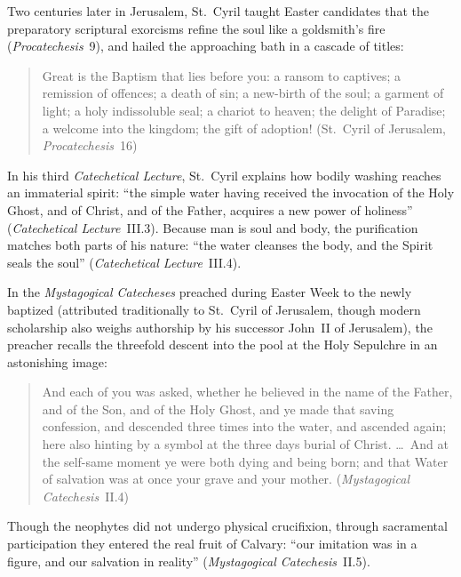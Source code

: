 Two centuries later in Jerusalem, St.~Cyril taught Easter candidates that the preparatory scriptural exorcisms refine the soul like a goldsmith's fire (\emph{Procatechesis}~9), and hailed the approaching bath in a cascade of titles:
\begin{quotation}
Great is the Baptism that lies before you: a ransom to captives; a remission of offences; a death of sin; a new-birth of the soul; a garment of light; a holy indissoluble seal; a chariot to heaven; the delight of Paradise; a welcome into the kingdom; the gift of adoption! (St.~Cyril of Jerusalem, \emph{Procatechesis}~16)
\end{quotation}
In his third \emph{Catechetical Lecture}, St.~Cyril explains how bodily washing reaches an immaterial spirit: ``the simple water having received the invocation of the Holy Ghost, and of Christ, and of the Father, acquires a new power of holiness'' (\emph{Catechetical Lecture}~III.3). Because man is soul and body, the purification matches both parts of his nature: ``the water cleanses the body, and the Spirit seals the soul'' (\emph{Catechetical Lecture}~III.4).

In the \emph{Mystagogical Catecheses} preached during Easter Week to the newly baptized (attributed traditionally to St.~Cyril of Jerusalem, though modern scholarship also weighs authorship by his successor John~II of Jerusalem), the preacher recalls the threefold descent into the pool at the Holy Sepulchre in an astonishing image:
\begin{quotation}
And each of you was asked, whether he believed in the name of the Father, and of the Son, and of the Holy Ghost, and ye made that saving confession, and descended three times into the water, and ascended again; here also hinting by a symbol at the three days burial of Christ. \dots\ And at the self-same moment ye were both dying and being born; and that Water of salvation was at once your grave and your mother. (\emph{Mystagogical Catechesis}~II.4)
\end{quotation}
Though the neophytes did not undergo physical crucifixion, through sacramental participation they entered the real fruit of Calvary: ``our imitation was in a figure, and our salvation in reality'' (\emph{Mystagogical Catechesis}~II.5).

